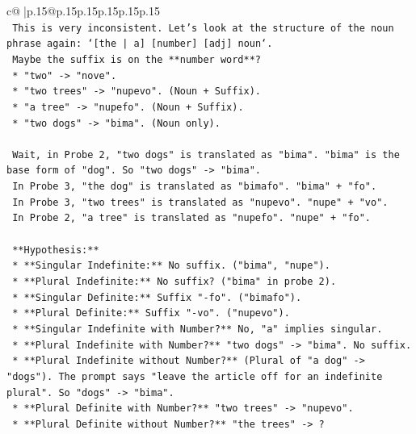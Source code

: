 \documentclass{article}
\begin{document}
{\begin{supertabular}{c@{$\;$}|p{.15\linewidth}@{}p{.15\linewidth}p{.15\linewidth}p{.15\linewidth}p{.15\linewidth}p{.15\linewidth}}
{{{\\ 
\texttt{    This is very inconsistent. Let's look at the structure of the noun phrase again: `{[}the | a{]} {[}number{]} {[}adj{]} noun`.} \\
\texttt{    Maybe the suffix is on the **number word**?} \\
\texttt{    *   "two" {-}> "nove".} \\
\texttt{    *   "two trees" {-}> "nupevo". (Noun + Suffix).} \\
\texttt{    *   "a tree" {-}> "nupefo". (Noun + Suffix).} \\
\texttt{    *   "two dogs" {-}> "bima". (Noun only).} \\
\\ 
\texttt{    Wait, in Probe 2, "two dogs" is translated as "bima". "bima" is the base form of "dog". So "two dogs" {-}> "bima".} \\
\texttt{    In Probe 3, "the dog" is translated as "bimafo". "bima" + "fo".} \\
\texttt{    In Probe 3, "two trees" is translated as "nupevo". "nupe" + "vo".} \\
\texttt{    In Probe 2, "a tree" is translated as "nupefo". "nupe" + "fo".} \\
\\ 
\texttt{    **Hypothesis:**} \\
\texttt{    *   **Singular Indefinite:** No suffix. ("bima", "nupe").} \\
\texttt{    *   **Plural Indefinite:** No suffix? ("bima" in probe 2).} \\
\texttt{    *   **Singular Definite:** Suffix "{-}fo". ("bimafo").} \\
\texttt{    *   **Plural Definite:** Suffix "{-}vo". ("nupevo").} \\
\texttt{    *   **Singular Indefinite with Number?** No, "a" implies singular.} \\
\texttt{    *   **Plural Indefinite with Number?** "two dogs" {-}> "bima". No suffix.} \\
\texttt{    *   **Plural Indefinite without Number?** (Plural of "a dog" {-}> "dogs"). The prompt says "leave the article off for an indefinite plural". So "dogs" {-}> "bima".} \\
\texttt{    *   **Plural Definite with Number?** "two trees" {-}> "nupevo".} \\
\texttt{    *   **Plural Definite without Number?** "the trees" {-}> ?} \\
\\ 
}}}
\end{supertabular}}
\end{document}
